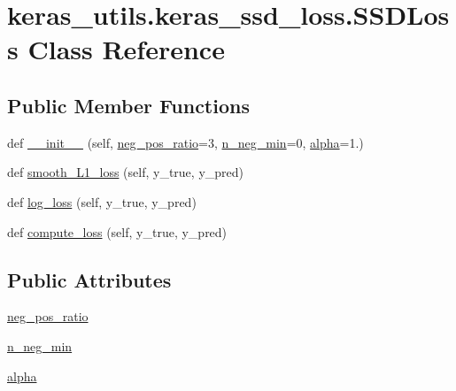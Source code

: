 \hypertarget{classkeras__utils_1_1keras__ssd__loss_1_1_s_s_d_loss}{}\section{keras\+\_\+utils.\+keras\+\_\+ssd\+\_\+loss.\+S\+S\+D\+Loss Class Reference}
\label{classkeras__utils_1_1keras__ssd__loss_1_1_s_s_d_loss}
\subsection*{Public Member Functions}
\begin{DoxyCompactItemize}
\item 
def \hyperlink{classkeras__utils_1_1keras__ssd__loss_1_1_s_s_d_loss_a2689ede880461cb86574c15d98d200f2}{\+\_\+\+\_\+init\+\_\+\+\_\+} (self, \hyperlink{classkeras__utils_1_1keras__ssd__loss_1_1_s_s_d_loss_af9f522438bf7085bea81c6431baf427b}{neg\+\_\+pos\+\_\+ratio}=3, \hyperlink{classkeras__utils_1_1keras__ssd__loss_1_1_s_s_d_loss_a933f7528c9efabe7dd5c91fd18d9cbf9}{n\+\_\+neg\+\_\+min}=0, \hyperlink{classkeras__utils_1_1keras__ssd__loss_1_1_s_s_d_loss_afb5702fa295ff501d5b4baf09e2af409}{alpha}=1.)
\item 
def \hyperlink{classkeras__utils_1_1keras__ssd__loss_1_1_s_s_d_loss_af8b9efac79d769cb5d55728946798bd3}{smooth\+\_\+\+L1\+\_\+loss} (self, y\+\_\+true, y\+\_\+pred)
\item 
def \hyperlink{classkeras__utils_1_1keras__ssd__loss_1_1_s_s_d_loss_ac961f7061c048c565a859f8d42159a0d}{log\+\_\+loss} (self, y\+\_\+true, y\+\_\+pred)
\item 
def \hyperlink{classkeras__utils_1_1keras__ssd__loss_1_1_s_s_d_loss_a4f40f84c97462853d5b19373e7c5933b}{compute\+\_\+loss} (self, y\+\_\+true, y\+\_\+pred)
\end{DoxyCompactItemize}
\subsection*{Public Attributes}
\begin{DoxyCompactItemize}
\item 
\hyperlink{classkeras__utils_1_1keras__ssd__loss_1_1_s_s_d_loss_af9f522438bf7085bea81c6431baf427b}{neg\+\_\+pos\+\_\+ratio}
\item 
\hyperlink{classkeras__utils_1_1keras__ssd__loss_1_1_s_s_d_loss_a933f7528c9efabe7dd5c91fd18d9cbf9}{n\+\_\+neg\+\_\+min}
\item 
\hyperlink{classkeras__utils_1_1keras__ssd__loss_1_1_s_s_d_loss_afb5702fa295ff501d5b4baf09e2af409}{alpha}
\end{DoxyCompactItemize}


